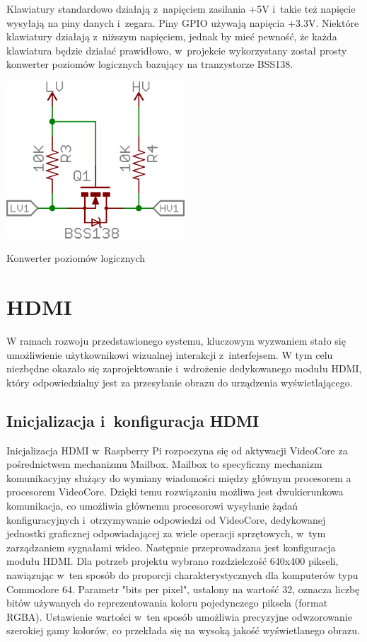 \documentclass[shortabstract]{iithesis}
\begin{document}
Klawiatury standardowo działają z~napięciem zasilania +5V i~takie też napięcie wysyłają na piny danych i~zegara. Piny GPIO używają napięcia +3.3V. Niektóre klawiatury działają z~niższym napięciem, jednak by mieć pewność, że każda klawiatura będzie działać prawidłowo, w~projekcie wykorzystany został prosty konwerter poziomów logicznych bazujący na tranzystorze BSS138.

\begingroup
\centering
\includegraphics[width=0.5\textwidth]{bss.png}
\captionsetup{type=figure}
\caption{Konwerter poziomów logicznych}
\endgroup

\section{HDMI}
W ramach rozwoju przedstawionego systemu, kluczowym wyzwaniem stało się umożliwienie użytkownikowi wizualnej interakcji z~interfejsem. W tym celu niezbędne okazało się zaprojektowanie i~wdrożenie dedykowanego modułu HDMI, który odpowiedzialny jest za przesyłanie obrazu do urządzenia wyświetlającego.
\subsection{Inicjalizacja i~konfiguracja HDMI}
Inicjalizacja HDMI w~Raspberry Pi rozpoczyna się od aktywacji VideoCore za pośrednictwem mechanizmu Mailbox. Mailbox to specyficzny mechanizm komunikacyjny służący do wymiany wiadomości między głównym procesorem a procesorem VideoCore. Dzięki temu rozwiązaniu możliwa jest dwukierunkowa komunikacja, co umożliwia głównemu procesorowi wysyłanie żądań konfiguracyjnych i~otrzymywanie odpowiedzi od VideoCore, dedykowanej jednostki graficznej odpowiadającej za wiele operacji sprzętowych, w~tym zarządzaniem sygnałami wideo.
Następnie przeprowadzana jest konfiguracja modułu HDMI. Dla potrzeb projektu wybrano rozdzielczość 640x400 pikseli, nawiązując w~ten sposób do proporcji charakterystycznych dla komputerów typu Commodore 64. Parametr "bits per pixel", ustalony na wartość 32, oznacza liczbę bitów używanych do reprezentowania koloru pojedynczego piksela (format RGBA). Ustawienie wartości w~ten sposób umożliwia precyzyjne odwzorowanie szerokiej gamy kolorów, co przekłada się na wysoką jakość wyświetlanego obrazu.
\end{document}
